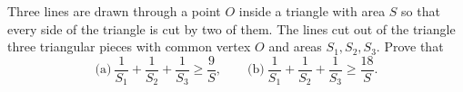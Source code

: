 Three lines are drawn through a point $O$ inside a triangle with area $S$ so that every side of the triangle is cut by two of them. The lines cut out of the triangle three triangular pieces with common vertex $O$ and areas $S_1, S_2, S_3$. Prove that
\[ \text{(a)}\ \frac{1}{S_1} + \frac{1}{S_2} + \frac{1}{S_3} \geq \frac{9}{S},\qquad \text{(b)}\ \frac{1}{S_1} + \frac{1}{S_2} + \frac{1}{S_3} \geq \frac{18}{S}. \]
